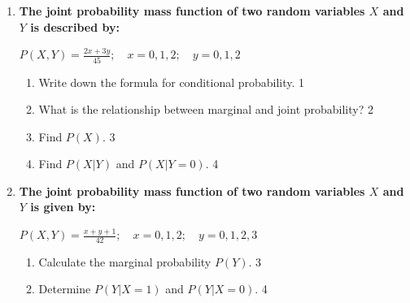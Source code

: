\documentclass[a4paper,oneside]{book}
\begin{document}
\begin{enumerate}
  \begin{center}
  \( \displaystyle P(X,Y) = \frac{x + 2y}{28}; \quad x = 0, 1; \quad y = 0, 1, 2, 3 \)
  \end{center}
 
  \begin{enumerate}
    \item
    	Write down the formula for conditional probability. \hfill 1
    \item
    	What is the relationship between marginal and joint probability? \hfill 2
    \item
    	Find \( P(X) \). \hfill 3
    \item
     	Find \( P(X \vert Y) \) and \( P(X \vert Y = 0) \). \hfill 4
  \end{enumerate}

  \item
  \textbf{The joint probability mass function of two random variables \( X \) and \( Y \) is described by:}
  
  \begin{center}
  \( \displaystyle P(X,Y) = \frac{2x + 3y}{45}; \quad x = 0, 1, 2; \quad y = 0, 1, 2 \)
  \end{center}
 
  \begin{enumerate}
    \item
    	Write down the formula for conditional probability. \hfill 1
    \item
    	What is the relationship between marginal and joint probability? \hfill 2
    \item
    	Find \( P(X) \). \hfill 3
    \item
     	Find \( P(X \vert Y) \) and \( P(X \vert Y = 0) \). \hfill 4
  \end{enumerate}

  
  \item
  \textbf{The joint probability mass function of two random variables \( X \) and \( Y \) is given by:}
  
  \begin{center}
  \( \displaystyle P(X,Y) = \frac{x + y + 1}{42}; \quad x = 0, 1, 2; \quad y = 0, 1, 2, 3 \)
  \end{center}
 
  \begin{enumerate}
    \item
    	Calculate the marginal probability \( P(Y) \). \hfill 3
    \item
     	Determine \( P(Y \vert X = 1) \) and \( P(Y \vert X = 0) \). \hfill 4
  \end{enumerate}


\end{enumerate}
\end{document}
